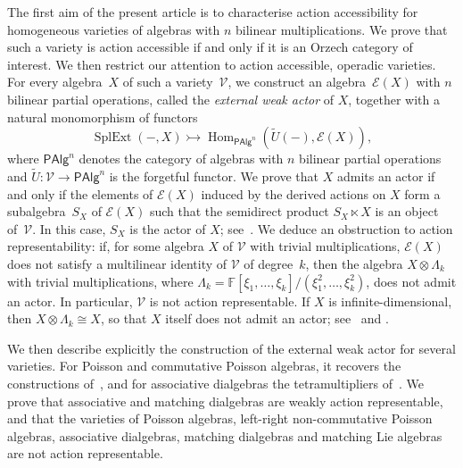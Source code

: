 \documentclass[reqno,a4paper]{amsart}
\theoremstyle{plain}
\theoremstyle{definition}
\theoremstyle{remark}
\numberwithin{equation}{section}
\newcommand{\F}{\mathbb{F}}
\newcommand{\E}{\mathcal{E}}
\newcommand{\V}{\mathcal{V}}
\DeclareMathOperator{\Hom}{Hom}
\DeclareMathOperator{\SplExt}{SplExt}
\newcommand{\PAlg}{\ensuremath{\mathsf{PAlg}}}
\begin{document}
The first aim of the present article is to characterise action accessibility for homogeneous varieties of algebras with $n$ bilinear multiplications. We prove that such a variety is action accessible if and only if it is an Orzech category of interest. We then restrict our attention to action accessible, operadic varieties. For every algebra~$X$ of such a variety~$\V$, we construct an algebra~$\E(X)$ with $n$ bilinear partial operations, called the \emph{external weak actor} of $X$, together with a natural monomorphism of functors
\[
\SplExt(-,X)\rightarrowtail\Hom_{\PAlg^n}(\widetilde U(-),\E(X)),
\]
where $\PAlg^n$ denotes the category of algebras with $n$ bilinear partial operations and $\widetilde U\colon\V\to\PAlg^n$ is the forgetful functor. We prove that $X$ admits an actor if and only if the elements of $\E(X)$ induced by the derived actions on $X$ form a subalgebra~$S_X$ of $\E(X)$ such that the semidirect product $S_X\ltimes X$ is an object of~$\V$. In this case, $S_X$ is the actor of $X$; see~. We deduce an obstruction to action representability: if, for some algebra $X$ of $\V$ with trivial multiplications, $\E(X)$ does not satisfy a multilinear identity of $\V$ of degree~$k$, then the algebra $X\otimes\Lambda_k$ with trivial multiplications, where $\Lambda_k=\F[\xi_1,\ldots,\xi_k]/(\xi_1^2,\ldots,\xi_k^2)$, does not admit an actor. In particular, $\V$ is not action representable. If $X$ is infinite-dimensional, then $X\otimes\Lambda_k\cong X$, so that $X$ itself does not admit an actor; see~ and .

We then describe explicitly the construction of the external weak actor for several varieties. For Poisson and commutative Poisson algebras, it recovers the constructions of~\cite{CigoliManciniMetere}, and for associative dialgebras the tetramultipliers of~\cite{CasasEtAlTetra}. We prove that associative and matching dialgebras are weakly action representable, and that the varieties of Poisson algebras, left-right non-commutative Poisson algebras, associative dialgebras, matching dialgebras and matching Lie algebras are not action representable.
\end{document}
